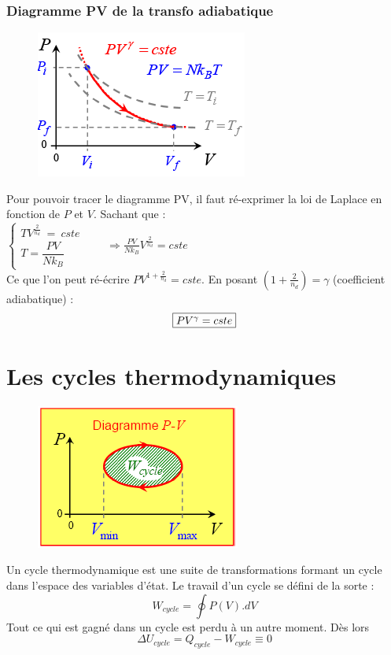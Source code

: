 \documentclass	[11pt, a4paper, openany]{book}
\begin{document}
\subsubsection{Diagramme PV de la transfo adiabatique}
\begin{figure}
\includegraphics[scale=0.44]{th/image14.png}
\end{figure}
Pour pouvoir tracer le diagramme PV, il faut ré-exprimer la loi de Laplace en fonction de $P$ et $V$. Sachant que : \\
$\left\{\begin{array}{l}
TV^{\frac{2}{n_d}}\ =\ cste\\
T = \dfrac{PV}{Nk_B}
\end{array}\right.$\ \ \ \ $\Rightarrow \frac{PV}{Nk_B}V^{\frac{2}{n_d}} = cste$\\
Ce que l'on peut ré-écrire $PV^{1 + \frac{2}{n_d}} = cste$. En posant $(1 + \frac{2}{n_d}) = \gamma$ (coefficient adiabatique) :
\begin{equation}
\fbox{$PV^\gamma = cste$}
\end{equation}
\newpage
\section{Les cycles thermodynamiques}
\begin{figure}
\includegraphics[scale=0.44]{th/image15.png}
\end{figure}
Un cycle thermodynamique est une suite de transformations formant un cycle dans l'espace des variables d'état. Le travail d'un cycle se défini de la sorte :
\begin{equation}
W_{cycle} = \oint P(V).dV
\end{equation}
Tout ce qui est gagné dans un cycle est perdu à un autre moment. Dès lors 
\begin{equation}
\Delta U_{cycle} = Q_{cycle} - W_{cycle} \equiv 0
\end{equation}
\end{document}
